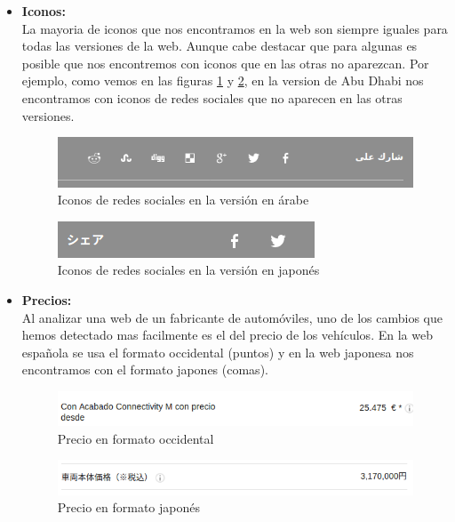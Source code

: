 \documentclass[a4paper,11pt]{article}
\begin{document}
\begin{itemize}
\begin{itemize}
  \item \textbf{Iconos:}\label{iconos}\\
  La mayoria de iconos que nos encontramos en la web son siempre iguales para todas las versiones de la web. Aunque cabe destacar que para algunas es posible que nos encontremos con iconos que en las otras no aparezcan. Por ejemplo, como vemos en las figuras \ref{fig:iconosabudabi} y \ref{fig:iconosjapo}, en la version de Abu Dhabi nos encontramos con iconos de redes sociales que no aparecen en las otras versiones.

  \begin{figure}[H]
    \centering
    \includegraphics[scale=0.4]{RSS_abudabi.png}
    \caption{Iconos de redes sociales en la versión en árabe}
    \label{fig:iconosabudabi}
  \end{figure}
  \begin{figure}[H]
    \centering
    \includegraphics[scale=0.6]{RSS_japo.png}
    \caption{Iconos de redes sociales en la versión en japonés}
    \label{fig:iconosjapo}
  \end{figure}

  \item \textbf{Precios:}\\
  Al analizar una web de un fabricante de automóviles, uno de los cambios que hemos detectado mas facilmente es el del precio de los vehículos. En la web española se usa el formato occidental (puntos) y en la web japonesa nos encontramos con el formato japones (comas).

  \begin{figure}[H]
    \centering
    \includegraphics[scale=0.6]{precioespanol.png}
    \caption{Precio en formato occidental}
    \label{fig:precioesp}
  \end{figure}
  \begin{figure}[H]
    \centering
    \includegraphics[scale=0.6]{preciojapo.png}
    \caption{Precio en formato japonés}
    \label{fig:preciojap}
  \end{figure}


\end{itemize}
\end{itemize}
\end{document}
